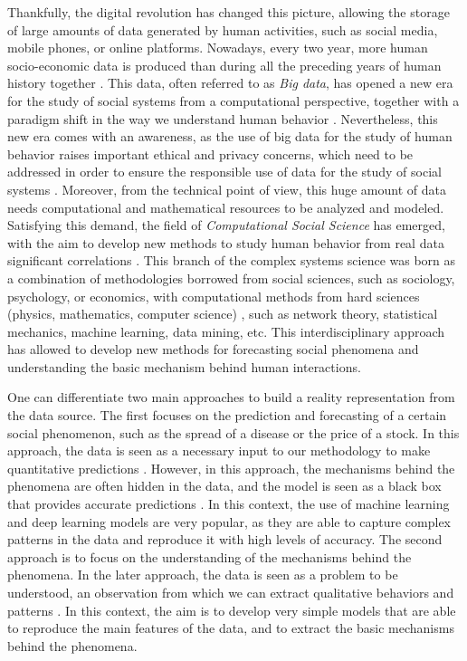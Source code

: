 Thankfully, the digital revolution has changed this picture, allowing the storage of large amounts of data generated by human activities, such as social media, mobile phones, or online platforms. Nowadays, every two year, more human socio-economic data is produced than during all the preceding years of human history together \cite{karsai2019computational}. This data, often referred to as \textit{Big data}, has opened a new era for the study of social systems from a computational perspective, together with a paradigm shift in the way we understand human behavior \cite{manyika-2011}. Nevertheless, this new era comes with an awareness, as the use of big data for the study of human behavior raises important ethical and privacy concerns, which need to be addressed in order to ensure the responsible use of data for the study of social systems \cite{boyd-2012}. Moreover, from the technical point of view, this huge amount of data needs computational and mathematical resources to be analyzed and modeled. Satisfying this demand, the field of \textit{Computational Social Science} has emerged, with the aim to develop new methods to study human behavior from real data significant correlations \cite{lazer-2009}. This branch of the complex systems science was born as a combination of methodologies borrowed from social sciences, such as sociology, psychology, or economics, with computational methods from hard sciences (physics, mathematics, computer science) \cite{watts-2007}, such as network theory, statistical mechanics, machine learning, data mining, etc. This interdisciplinary approach has allowed to develop new methods for forecasting social phenomena and understanding the basic mechanism behind human interactions. 

One can differentiate two main approaches to build a reality representation from the data source. The first focuses on the prediction and forecasting of a certain social phenomenon, such as the spread of a disease or the price of a stock. In this approach, the data is seen as a necessary input to our methodology to make quantitative predictions \cite{lazer-2009}. However, in this approach, the mechanisms behind the phenomena are often hidden in the data, and the model is seen as a black box that provides accurate predictions \cite{rudin-2019}. In this context, the use of machine learning \cite{murphy-2012} and deep learning \cite{goodfellow-2016} models are  very popular, as they are able to capture complex patterns in the data and reproduce it with high levels of accuracy. The second approach is to focus on the understanding of the mechanisms behind the phenomena. In the later approach, the data is seen as a problem to be understood, an observation from which we can extract qualitative behaviors and patterns \cite{axelrod2006agent}. In this context, the aim is to develop very simple models that are able to reproduce the main features of the data, and to extract the basic mechanisms behind the phenomena.

